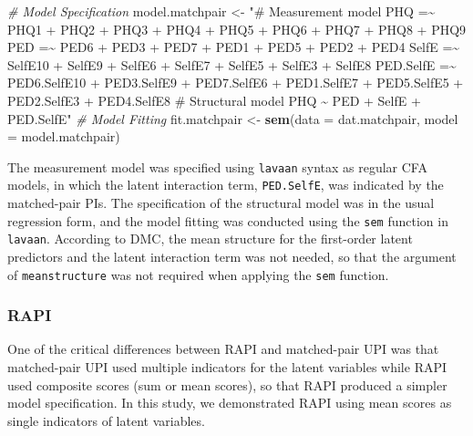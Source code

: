 \documentclass[
  man]{apa7}
\newenvironment{Shaded}{\begin{snugshade}}{\end{snugshade}}
\newcommand{\AttributeTok}[1]{\textcolor[rgb]{0.13,0.29,0.53}{#1}}
\newcommand{\CommentTok}[1]{\textcolor[rgb]{0.56,0.35,0.01}{\textit{#1}}}
\newcommand{\FunctionTok}[1]{\textcolor[rgb]{0.13,0.29,0.53}{\textbf{#1}}}
\newcommand{\NormalTok}[1]{#1}
\newcommand{\OtherTok}[1]{\textcolor[rgb]{0.56,0.35,0.01}{#1}}
\newcommand{\StringTok}[1]{\textcolor[rgb]{0.31,0.60,0.02}{#1}}
\begin{document}
\begin{Shaded}
\begin{Highlighting}[]
\CommentTok{\# Model Specification}
\NormalTok{model.matchpair }\OtherTok{\textless{}{-}} \StringTok{"\# Measurement model}
\StringTok{                      PHQ =\textasciitilde{} PHQ1 + PHQ2 + PHQ3 + PHQ4 + PHQ5 + PHQ6 + PHQ7 + PHQ8 + PHQ9}
\StringTok{                      PED =\textasciitilde{} PED6 + PED3 + PED7 + PED1 + PED5 + PED2 + PED4}
\StringTok{                      SelfE =\textasciitilde{} SelfE10 + SelfE9 + SelfE6 + SelfE7 + SelfE5 + SelfE3 + SelfE8}
\StringTok{                      PED.SelfE =\textasciitilde{} PED6.SelfE10 + PED3.SelfE9 + PED7.SelfE6 + PED1.SelfE7 + }
\StringTok{                                   PED5.SelfE5 + PED2.SelfE3 + PED4.SelfE8}
\StringTok{                    \# Structural model}
\StringTok{                      PHQ \textasciitilde{} PED + SelfE + PED.SelfE"}
\CommentTok{\# Model Fitting}
\NormalTok{fit.matchpair }\OtherTok{\textless{}{-}} \FunctionTok{sem}\NormalTok{(}\AttributeTok{data =}\NormalTok{ dat.matchpair, }\AttributeTok{model =}\NormalTok{ model.matchpair)}
\end{Highlighting}
\end{Shaded}

\normalsize
The measurement model was specified using \texttt{lavaan} syntax as regular CFA models, in which the latent interaction term, \texttt{PED.SelfE}, was indicated by the matched-pair PIs. The specification of the structural model was in the usual regression form, and the model fitting was conducted using the \texttt{sem} function in \texttt{lavaan}. According to DMC, the mean structure for the first-order latent predictors and the latent interaction term was not needed, so that the argument of \texttt{meanstructure} was not required when applying the \texttt{sem} function.

\hypertarget{rapi}{%
\subsubsection{RAPI}\label{rapi}}

One of the critical differences between RAPI and matched-pair UPI was that matched-pair UPI used multiple indicators for the latent variables while RAPI used composite scores (sum or mean scores), so that RAPI produced a simpler model specification. In this study, we demonstrated RAPI using mean scores as single indicators of latent variables.

\footnotesize
\end{document}
